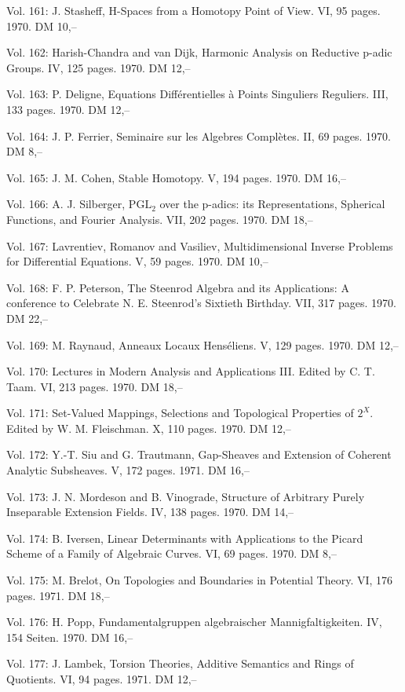 Vol. 161: J. Stasheff, H-Spaces from a Homotopy Point of View. VI, 95 pages. 1970. DM 10,--

Vol. 162: Harish-Chandra and van Dijk, Harmonic Analysis on Reductive p-adic Groups. IV, 125 pages. 1970. DM 12,--

Vol. 163: P. Deligne, Equations Différentielles à Points Singuliers Reguliers. III, 133 pages. 1970. DM 12,--

Vol. 164: J. P. Ferrier, Seminaire sur les Algebres Complètes. II, 69 pages. 1970. DM 8,--

Vol. 165: J. M. Cohen, Stable Homotopy. V, 194 pages. 1970. DM 16,--

Vol. 166: A. J. Silberger, \(\mathrm{PGL}_2\) over the p-adics: its Representations, Spherical Functions, and Fourier Analysis. VII, 202 pages. 1970. DM 18,--

Vol. 167: Lavrentiev, Romanov and Vasiliev, Multidimensional Inverse Problems for Differential Equations. V, 59 pages. 1970. DM 10,--

Vol. 168: F. P. Peterson, The Steenrod Algebra and its Applications: A conference to Celebrate N. E. Steenrod's Sixtieth Birthday. VII, 317 pages. 1970. DM 22,--

Vol. 169: M. Raynaud, Anneaux Locaux Henséliens. V, 129 pages. 1970. DM 12,--

Vol. 170: Lectures in Modern Analysis and Applications III. Edited by C. T. Taam. VI, 213 pages. 1970. DM 18,--

Vol. 171: Set-Valued Mappings, Selections and Topological Properties of \(2^X\). Edited by W. M. Fleischman. X, 110 pages. 1970. DM 12,--

Vol. 172: Y.-T. Siu and G. Trautmann, Gap-Sheaves and Extension of Coherent Analytic Subsheaves. V, 172 pages. 1971. DM 16,--

Vol. 173: J. N. Mordeson and B. Vinograde, Structure of Arbitrary Purely Inseparable Extension Fields. IV, 138 pages. 1970. DM 14,--

Vol. 174: B. Iversen, Linear Determinants with Applications to the Picard Scheme of a Family of Algebraic Curves. VI, 69 pages. 1970. DM 8,--

Vol. 175: M. Brelot, On Topologies and Boundaries in Potential Theory. VI, 176 pages. 1971. DM 18,--

Vol. 176: H. Popp, Fundamentalgruppen algebraischer Mannigfaltigkeiten. IV, 154 Seiten. 1970. DM 16,--

Vol. 177: J. Lambek, Torsion Theories, Additive Semantics and Rings of Quotients. VI, 94 pages. 1971. DM 12,--

